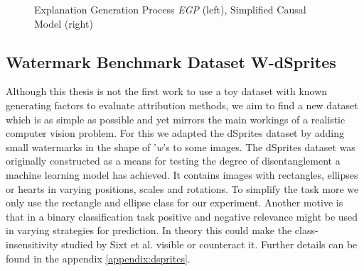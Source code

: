 \begin{figure}[H]
    \centering
    \caption[Explanation Generation Process (EGP)]{Explanation Generation Process \textit{EGP} (left), Simplified Causal Model (right)}
    \label{fig:egp}
\end{figure}

\subsection{Watermark Benchmark Dataset W-dSprites}\label{section:causal_model}
Although this thesis is not the first work to use a toy dataset with known generating factors to evaluate attribution methods, we aim to find a new dataset which is as simple as possible and yet mirrors the main workings of a realistic computer vision problem. For this we adapted the dSprites dataset \cite{dsprites17} by adding small watermarks in the shape of '\textit{w}'s to some images. The dSprites dataset was originally constructed as a means for testing the degree of disentanglement a machine learning model has achieved. It contains images with rectangles, ellipses or hearts in varying positions, scales and rotations. To simplify the task more we only use the rectangle and ellipse class for our experiment. Another motive is that in a binary classification task positive and negative relevance might be used in varying strategies for prediction. In theory this could make the class-insensitivity studied by Sixt et al. \cite{Sixt2020} visible or counteract it. Further details can be found in the appendix \cref{appendix:dsprites}.

